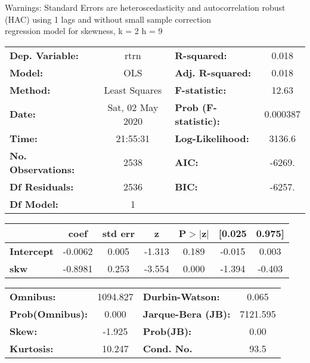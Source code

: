 Warnings: \newline
 [1] Standard Errors are heteroscedasticity and autocorrelation robust (HAC) using 1 lags and without small sample correction\\ 

regression model for skewness, k = 2 h = 9\begin{center}
\begin{tabular}{lclc}
\toprule
\textbf{Dep. Variable:}    &       rtrn       & \textbf{  R-squared:         } &     0.018   \\
\textbf{Model:}            &       OLS        & \textbf{  Adj. R-squared:    } &     0.018   \\
\textbf{Method:}           &  Least Squares   & \textbf{  F-statistic:       } &     12.63   \\
\textbf{Date:}             & Sat, 02 May 2020 & \textbf{  Prob (F-statistic):} &  0.000387   \\
\textbf{Time:}             &     21:55:31     & \textbf{  Log-Likelihood:    } &    3136.6   \\
\textbf{No. Observations:} &        2538      & \textbf{  AIC:               } &    -6269.   \\
\textbf{Df Residuals:}     &        2536      & \textbf{  BIC:               } &    -6257.   \\
\textbf{Df Model:}         &           1      & \textbf{                     } &             \\
\bottomrule
\end{tabular}
\begin{tabular}{lcccccc}
                   & \textbf{coef} & \textbf{std err} & \textbf{z} & \textbf{P$> |$z$|$} & \textbf{[0.025} & \textbf{0.975]}  \\
\midrule
\textbf{Intercept} &      -0.0062  &        0.005     &    -1.313  &         0.189        &       -0.015    &        0.003     \\
\textbf{skw}       &      -0.8981  &        0.253     &    -3.554  &         0.000        &       -1.394    &       -0.403     \\
\bottomrule
\end{tabular}
\begin{tabular}{lclc}
\textbf{Omnibus:}       & 1094.827 & \textbf{  Durbin-Watson:     } &    0.065  \\
\textbf{Prob(Omnibus):} &   0.000  & \textbf{  Jarque-Bera (JB):  } & 7121.595  \\
\textbf{Skew:}          &  -1.925  & \textbf{  Prob(JB):          } &     0.00  \\
\textbf{Kurtosis:}      &  10.247  & \textbf{  Cond. No.          } &     93.5  \\
\bottomrule
\end{tabular}
\end{center}

